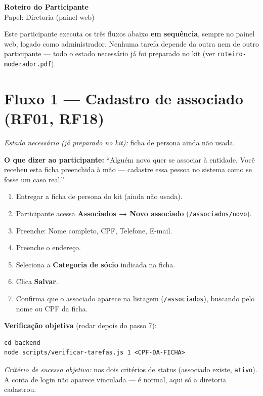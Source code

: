 \documentclass[11pt,a4paper]{article}
\newcommand{\dizer}[1]{%
  \noindent\colorbox{lightbg}{%
    \begin{minipage}{0.95\linewidth}
    \vspace{1mm}
    \textbf{O que dizer ao participante:} ``#1''
    \vspace{1mm}
    \end{minipage}%
  }\vspace{3mm}
}
\newcommand{\criterio}[1]{%
  \noindent\textit{Critério de sucesso objetivo:} #1
}
\newcommand{\estado}[1]{%
  \noindent\textit{Estado necessário (já preparado no kit):} #1
  \vspace{2mm}
}
\begin{document}
\begin{center}
  {\LARGE\bfseries\color{brandgreen} Roteiro do Participante}\\[2mm]
  {\large Papel: Diretoria (painel web)}
\end{center}

\vspace{2mm}
\noindent\colorbox{lightbg}{%
  \begin{minipage}{0.95\linewidth}
  \vspace{1mm}
  Este participante executa os três fluxos abaixo \textbf{em sequência}, sempre no painel web,
  logado como administrador. Nenhuma tarefa depende da outra nem de outro participante --- todo o
  estado necessário já foi preparado no kit (ver \texttt{roteiro-moderador.pdf}).
  \vspace{1mm}
  \end{minipage}%
}

\section*{Fluxo 1 --- Cadastro de associado (RF01, RF18)}

\estado{ficha de persona ainda não usada.}

\dizer{Alguém novo quer se associar à entidade. Você recebeu esta ficha preenchida à mão ---
cadastre essa pessoa no sistema como se fosse um caso real.}

\begin{enumerate}[leftmargin=6mm]
  \item Entregar a ficha de persona do kit (ainda não usada).
  \item Participante acessa \textbf{Associados → Novo associado} (\texttt{/associados/novo}).
  \item Preenche: Nome completo, CPF, Telefone, E-mail.
  \item Preenche o endereço.
  \item Seleciona a \textbf{Categoria de sócio} indicada na ficha.
  \item Clica \textbf{Salvar}.
  \item Confirma que o associado aparece na listagem (\texttt{/associados}), buscando pelo nome ou
    CPF da ficha.
\end{enumerate}

\textbf{Verificação objetiva} (rodar depois do passo 7):
\begin{verbatim}
cd backend
node scripts/verificar-tarefas.js 1 <CPF-DA-FICHA>
\end{verbatim}
\criterio{nos dois critérios de status (associado existe, \texttt{ativo}). A conta de login não
aparece vinculada --- é normal, aqui só a diretoria cadastrou.}
\end{document}
